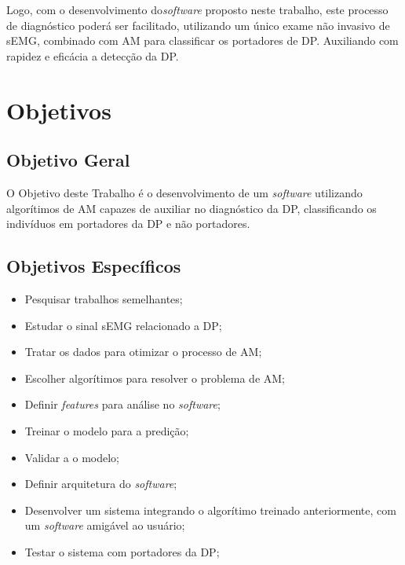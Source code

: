 Logo, com o desenvolvimento do\textit{software} proposto neste trabalho, este processo de diagnóstico poderá ser facilitado, utilizando um único exame não invasivo de sEMG, combinado com AM para classificar os portadores de DP. Auxiliando com rapidez e eficácia a detecção da DP. 

\section{Objetivos} 
\subsection{Objetivo Geral} 
O Objetivo deste Trabalho é o desenvolvimento de um \textit{software} utilizando algorítimos de AM capazes de auxiliar no diagnóstico da DP, classificando os indivíduos em portadores da DP e não portadores. 

\subsection{Objetivos Específicos}
\begin{itemize}
    \item Pesquisar trabalhos semelhantes;
    \item Estudar o sinal sEMG relacionado a DP;
    \item Tratar os dados para otimizar o processo de AM;
    \item Escolher algorítimos para resolver o problema de AM;
    \item Definir \textit{features} para análise no \textit{software};
    \item Treinar o modelo para a predição;
    \item Validar a o modelo;
    \item Definir arquitetura do \textit{software};
    \item Desenvolver um sistema integrando o algorítimo treinado anteriormente, com um \textit{software} amigável ao usuário;
    \item Testar o sistema com portadores da DP;
\end{itemize}